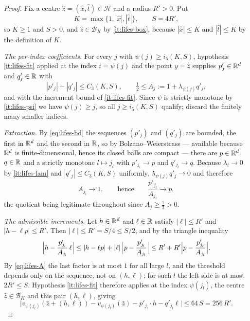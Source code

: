 \begin{proof}
Fix a centre $\hat z=(\hat x,\hat t)\in\mathcal H$ and a radius $R'>0$. Put
\[
  K=\max\bigl\{1,|\hat x|,|\hat t|\bigr\},\qquad S=4R' ,
\]
so $K\ge1$ and $S>0$, and $\hat z\in\mathcal B_K$ by \ref{it:lifes-box},
because $|\hat x|\le K$ and $|\hat t|\le K$ by the definition of $K$.

\emph{The per-index coefficients.} For every $j$ with $\psi(j)\ge i_5(K,S)$,
hypothesis \ref{it:lifes-fit} applied at the index $i=\psi(j)$ and the point
$y=\hat z$ supplies $p'_j\in\mathbb{R}^d$ and $q'_j\in\mathbb{R}$ with
\begin{equation}\label{eq:lifes-bd}
  |p'_j|+|q'_j|\le C_3(K,S),\qquad \tfrac12\le A_j:=1+\lambda_{\psi(j)}q'_j ,
\end{equation}
and with the increment bound of \ref{it:lifes-fit}. Since $\psi$ is strictly
monotone by \ref{it:lifes-psi} we have $\psi(j)\ge j$, so all $j\ge i_5(K,S)$
qualify; discard the finitely many smaller indices.

\emph{Extraction.} By \eqref{eq:lifes-bd} the sequences $(p'_j)$ and $(q'_j)$
are bounded, the first in $\mathbb{R}^d$ and the second in $\mathbb{R}$, so by
Bolzano--Weierstrass --- available because $\mathbb{R}^d$ is finite-dimensional, hence
its closed balls are compact --- there are $p\in\mathbb{R}^d$, $q\in\mathbb{R}$ and a strictly
monotone $l\mapsto j_l$ with $p'_{j_l}\to p$ and $q'_{j_l}\to q$. Because
$\lambda_i\to0$ by \ref{it:lifes-lam} and $|q'_j|\le C_3(K,S)$ uniformly,
$\lambda_{\psi(j)}q'_j\to0$ and therefore
\begin{equation}\label{eq:lifes-A}
  A_{j_l}\to1,\qquad\text{hence}\qquad \frac{p'_{j_l}}{A_{j_l}}\to p ,
\end{equation}
the quotient being legitimate throughout since $A_j\ge\tfrac12>0$.

\emph{The admissible increments.} Let $h\in\mathbb{R}^d$ and $\ell\in\mathbb{R}$ satisfy
$|\ell|\le R'$ and $|h-\ell p|\le R'$. Then $|\ell|\le R'=S/4\le S/2$, and by
the triangle inequality
\[
  \Bigl|h-\frac{p'_{j_l}}{A_{j_l}}\,\ell\Bigr|
   \le|h-\ell p|+|\ell|\,\Bigl|p-\frac{p'_{j_l}}{A_{j_l}}\Bigr|
   \le R'+R'\Bigl|p-\frac{p'_{j_l}}{A_{j_l}}\Bigr| .
\]
By \eqref{eq:lifes-A} the last factor is at most $1$ for all large $l$, and the
threshold depends only on the sequence, not on $(h,\ell)$; for such $l$ the
left side is at most $2R'\le S$. Hypothesis \ref{it:lifes-fit} therefore applies
at the index $\psi(j_l)$, the centre $\hat z\in\mathcal B_K$ and this pair
$(h,\ell)$, giving
\begin{equation}\label{eq:lifes-pre}
  \bigl|v_{\psi(j_l)}(\hat z+(h,\ell))-v_{\psi(j_l)}(\hat z)
    -p'_{j_l}\cdot h-q'_{j_l}\ell\bigr|\le 64\,S=256\,R' .
\end{equation}


\end{proof}
